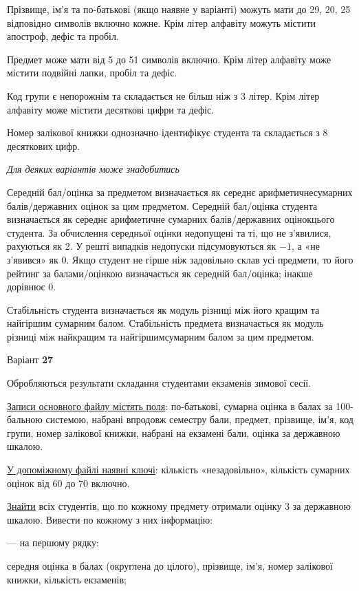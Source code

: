 \documentclass[11pt, ukrainian]{article}
\begin{document}
Прізвище, ім’я та по-батькові (якщо наявне у варіанті) можуть мати до 29, 20, 25 відповідно символів включно кожне. 
Крім літер алфавіту можуть містити апостроф, дефіс та пробіл.

Предмет може мати від 5 до 51 символів включно. 
Крім літер алфавіту може містити подвійні лапки, пробіл та дефіс.

Код групи є непорожнім та складається не більш ніж з 3 літер. 
Крім літер алфавіту може містити десяткові цифри та дефіс.


Номер залікової книжки однозначно ідентифікує студента та складається з 8 десяткових цифр. 

\bigskip\textit{Для деяких варіантів може знадобитись}

Середній бал/оцінка за предметом визначається як середнє арифметичнесумарних балів/державних оцінок за цим предметом. 
Середній бал/оцінка студента визначається як середнє арифметичне сумарних балів/державних оцінокцього студента. 
За обчислення середньої оцінки недопущені та ті, що не з’явилися, рахуються як 2.
У решті випадків недопуски підсумовуються як $-1$, а «не з’явився» як 0.
Якщо студент не гірше ніж задовільно склав усі предмети, 
то його рейтинг за балами/оцінкою визначається як середній бал/оцінка; інакше дорівнює 0.

Стабільність студента визначається як модуль різниці між його кращим та найгіршим сумарним балом.
Стабільність предмета визначається як модуль різниці між найкращим та найгіршимсумарним балом за цим предметом.




\par
\newpage
{\center Варіант  \No \textbf { 27 }\par}
\bigskip
Обробляються результати складання студентами екзаменів зимової сесії.

\underline{Записи основного файлу містять поля}: по-батькові, сумарна оцінка в балах за 100-бальною системою, набрані впродовж семестру бали, предмет, прізвище, ім’я, код групи, номер залікової книжки, набрані на екзамені бали, оцінка за державною шкалою.

\underline{У допоміжному файлі наявні ключі}: кількість «незадовільно», кількість сумарних оцінок від 60 до 70 включно.

\underline{Знайти} всіх студентів, що по кожному предмету отримали оцінку 3 за державною шкалою. Вивести по кожному з них інформацію:\par
{\noindent}--- на першому рядку:\par
середня оцінка в балах (округлена до цілого), прізвище, ім’я, номер залікової книжки, кількість екзаменів;
\end{document}
